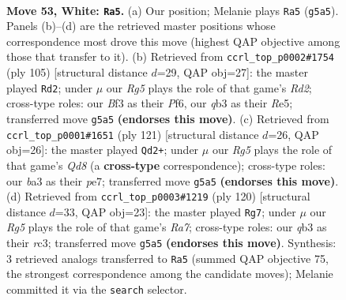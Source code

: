 \documentclass[11pt]{article}
\begin{document}
\clearpage

\begin{figure}[p]\centering
\begin{subfigure}{0.46\textwidth}\centering
\resizebox{\linewidth}{!}{%
\newchessgame
\chessboard[
  setfen={8/p7/5P2/6R1/1p1k4/bq3BK1/8/8 w - - 0 53},
  showmover=false,
  pgfstyle=straightmove, color=movearrow, markmove={g5-a5}
]}
\caption{}
\end{subfigure}\hfill
\begin{subfigure}{0.46\textwidth}\centering
\resizebox{\linewidth}{!}{%
\newchessgame
\chessboard[
  setfen={8/3r1k2/5p2/4r3/2K5/4PQ2/6PP/8 b - - 14 53},
  showmover=false,
  pgfstyle=straightmove, color=movearrow, markmove={d7-d2}
]}
\caption{}
\end{subfigure}
\\[4pt]
\begin{subfigure}{0.46\textwidth}\centering
\resizebox{\linewidth}{!}{%
\newchessgame
\chessboard[
  setfen={8/4P3/1kb1Q1P1/8/8/3P4/1K6/3q4 b - - 2 61},
  showmover=false,
  pgfstyle=straightmove, color=movearrow, markmove={d1-d2}
]}
\caption{}
\end{subfigure}\hfill
\begin{subfigure}{0.46\textwidth}\centering
\resizebox{\linewidth}{!}{%
\newchessgame
\chessboard[
  setfen={4k3/R7/6p1/5b2/8/2r1BK2/7P/8 w - - 26 61},
  showmover=false,
  pgfstyle=straightmove, color=movearrow, markmove={a7-g7}
]}
\caption{}
\end{subfigure}
\caption{\textbf{Move 53, White: \texttt{Ra5}.} (a) Our position; Melanie plays \texttt{Ra5} (\texttt{g5a5}). Panels (b)--(d) are the retrieved master positions whose correspondence most drove this move (highest QAP objective among those that transfer to it). (b) Retrieved from \texttt{ccrl\_top\_p0002\#1754} (ply 105) [structural distance $d$=29, QAP obj=27]: the master played \texttt{Rd2}; under $\mu$ our \emph{Rg5} plays the role of that game's \emph{Rd2}; cross-type roles: our \emph{B}f3 as their \emph{P}f6, our \emph{q}b3 as their \emph{R}e5; transferred move \texttt{g5a5} \textbf{(endorses this move)}. (c) Retrieved from \texttt{ccrl\_top\_p0001\#1651} (ply 121) [structural distance $d$=26, QAP obj=26]: the master played \texttt{Qd2+}; under $\mu$ our \emph{Rg5} plays the role of that game's \emph{Qd8} (a \textbf{cross-type} correspondence); cross-type roles: our \emph{b}a3 as their \emph{p}e7; transferred move \texttt{g5a5} \textbf{(endorses this move)}. (d) Retrieved from \texttt{ccrl\_top\_p0003\#1219} (ply 120) [structural distance $d$=33, QAP obj=23]: the master played \texttt{Rg7}; under $\mu$ our \emph{Rg5} plays the role of that game's \emph{Ra7}; cross-type roles: our \emph{q}b3 as their \emph{r}c3; transferred move \texttt{g5a5} \textbf{(endorses this move)}. Synthesis: 3 retrieved analogs transferred to \texttt{Ra5} (summed QAP objective 75, the strongest correspondence among the candidate moves); Melanie committed it via the \texttt{search} selector.}
\label{fig:thought-m104}
\end{figure}
\end{document}
